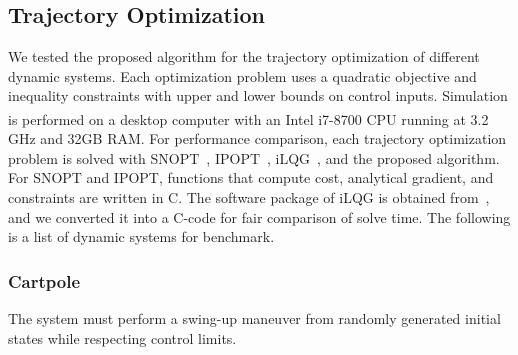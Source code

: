 		
		
		
		
		




\subsection{Trajectory Optimization}
We tested the proposed algorithm for the trajectory optimization of different dynamic systems. Each optimization problem uses a quadratic objective and inequality constraints with upper and lower bounds on control inputs. Simulation is performed on a desktop computer with an Intel\textsuperscript{\textregistered} i7-8700 CPU running at 3.2 GHz and 32GB RAM. For performance comparison, each trajectory optimization problem is solved with SNOPT~\cite{gill2002snopt}, IPOPT~\cite{wachter2006implementation}, iLQG~\cite{6907001}, and the proposed algorithm. For SNOPT and IPOPT, functions that compute cost, analytical gradient, and constraints are written in C. The software package of iLQG is obtained from~\cite{iLQG2015}, and we converted it into a C-code for fair comparison of solve time. 
The following is a list of dynamic systems for benchmark.

\subsubsection{Cartpole} The system must perform a swing-up maneuver from randomly generated initial states while respecting control limits.



